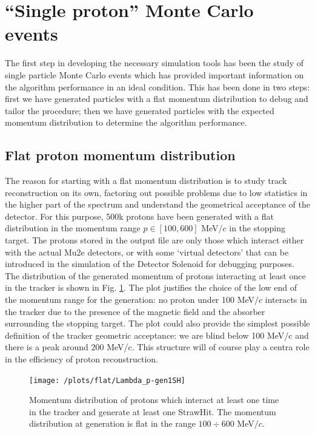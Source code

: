 \documentclass[12pt,a4paper,openright, oneside, titlepage]{book} %
\begin{document}
\section{``Single proton'' Monte Carlo events}
The first step in developing the necessary simulation tools has been the study of single particle Monte Carlo events which has provided important information on the algorithm performance in an ideal condition. 
This has been done in two steps: 
first we have generated particles with a flat momentum distribution to debug and tailor the procedure; 
then we have generated particles with the expected momentum distribution to determine the algorithm performance.

\subsection{Flat proton momentum distribution}
The reason for starting with a flat momentum distribution is to study track reconstruction on its own, factoring out possible problems due to low statistics in the higher part of the spectrum and understand the geometrical acceptance of the detector. 
For this purpose, 500k protons have been generated with a flat distribution in the momentum range $p\in[100,600]$ MeV$/c$ in the stopping target. 
The protons stored in the output file are only those which interact either with the actual Mu2e detectors, or with some `virtual detectors' that can be introduced in the simulation of the Detector Solenoid for debugging purposes.\\
The distribution of the generated momentum of protons interacting at least once in the tracker is shown in Fig. \ref{_flat_Lambda_p-gen1SH}. 
The plot justifies the choice of the low end of the momentum range for the generation: no proton under 100 MeV$/c$ interacts in the tracker due to the presence of the magnetic field and the absorber surrounding the stopping target. 
The plot could also provide the simplest possible definition of the tracker geometric acceptance:
we are blind below 100 MeV/c and there is a peak around 200 MeV/c. This structure will of course play a centra role in the efficiency of proton reconstruction. \\

\begin{figure}[!htb]
\centering
\texttt{[image: /plots/flat/Lambda\_p-gen1SH]}
\caption[Momentum distribution for particles interacting in the tracker]{Momentum distribution of protons which interact 
at least one time in the tracker and generate at least one StrawHit. 
The momentum distribution at generation is flat in the range $100 \div 600$ MeV$/c$.}
\label{_flat_Lambda_p-gen1SH}
\end{figure}
\end{document}
